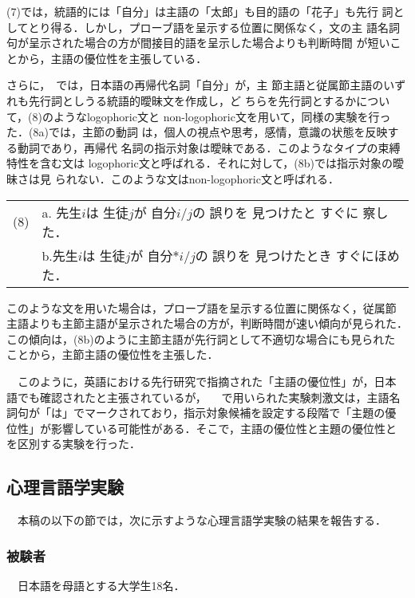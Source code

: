 (7)では，統語的には「自分」は主語の「太郎」も目的語の「花子」も先行
詞としてとり得る．しかし，プローブ語を呈示する位置に関係なく，文の主
語名詞句が呈示された場合の方が間接目的語を呈示した場合よりも判断時間
が短いことから，主語の優位性を主張している．


  さらに，~\cite{nagata:1995}では，日本語の再帰代名詞「自分」が，主
  節主語と従属節主語のいずれも先行詞としうる統語的曖昧文を作成し，ど
  ちらを先行詞とするかについて，(8)のようなlogophoric文と
  non-logophoric文を用いて，同様の実験を行った．(8a)では，主節の動詞
  は，個人の視点や思考，感情，意識の状態を反映する動詞であり，再帰代
  名詞の指示対象は曖昧である．このようなタイプの束縛特性を含む文は
  logophoric文と呼ばれる．それに対して，(8b)では指示対象の曖昧さは見
  られない．このような文はnon-logophoric文と呼ばれる．


\vspace{3mm}
\begin{tabular}{cl}
(8)& a. 先生$i$は 生徒$j$が 自分$i/j$の 誤りを 見つけたと すぐに 察した．\\
   &   b.先生$i$は 生徒$j$が 自分$*i/j$の 誤りを 見つけたとき すぐにほめた．\\
\end{tabular}
\vspace{3mm}

このような文を用いた場合は，プローブ語を呈示する位置に関係なく，従属節
主語よりも主節主語が呈示された場合の方が，判断時間が速い傾向が見られた．
この傾向は，(8b)のように主節主語が先行詞として不適切な場合にも見られた
ことから，主節主語の優位性を主張した．

　このように，英語における先行研究で指摘された「主語の優位性」が，日本
語でも確認されたと主張されているが，~
\cite{nagata:1991}~\cite{nagata:1995}で用いられた実験刺激文は，主語名
詞句が「は」でマークされており，指示対象候補を設定する段階で「主題の優
位性」が影響している可能性がある．そこで，主語の優位性と主題の優位性と
を区別する実験を行った．

\subsection{心理言語学実験}
　本稿の以下の節では，次に示すような心理言語学実験の結果を報告する．

\vspace{-4mm}
\subsubsection{被験者}
　日本語を母語とする大学生18名．
\vspace{-4mm}


